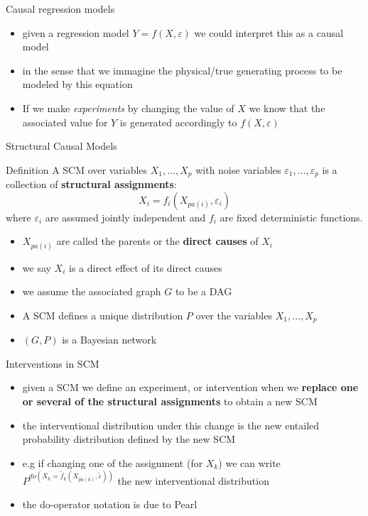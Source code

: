 \documentclass{beamer}
\begin{document}
\begin{frame}{Causal regression models}
      \begin{itemize}
	      \item given a regression model $Y = f(X, \varepsilon)$ 
		      we could interpret this as a causal model 
	      \item in the sense that we immagine the physical/true generating process 
		      to be modeled by this equation 
	      \item<2-> If we make \emph{experiments} by changing the value of $X$ we know that 
		      the associated value for $Y$ is generated accordingly to $f(X, \varepsilon)$ 
      \end{itemize}
\end{frame}

\begin{frame}{Structural Causal Models}
	\begin{block}{Definition \citep{peters2017elements}}
 A SCM over variables $X_1, \ldots, X_p$ with noise variables $\varepsilon_1, \ldots, \varepsilon_p$ is 
	 a collection of \textbf{structural assignments}: 
	   \[ X_i =  f_i(X_{pa(i)}, \varepsilon_i) \]
	   where $\varepsilon_i$ are assumed jointly independent and $f_i$ are fixed deterministic functions.  
	 \end{block}
	 \begin{itemize}
		 \item $X_{pa(i)}$ are called the parents or the \textbf{direct causes} of $X_i$
		 \item we say $X_i$ is a direct effect of its direct causes 
		 \item we assume the associated graph $G$ to be a DAG 
		 \item<2-> A SCM defines a unique distribution $P$ over the variables $X_1, \ldots, X_p$ 
		 \item<3-> $(G, P)$ is a Bayesian network 
	 \end{itemize}
\end{frame}


\begin{frame}{Interventions in SCM}
	\begin{itemize}
		\item given a SCM we define an experiment, or intervention when we \textbf{replace one or several of the structural assignments} to obtain a new SCM
		\item<2-> the interventional distribution under this change is the new entailed probability distribution defined by the new SCM
		\item<3-> e.g if changing one of the assignment (for $X_k$) we can write $P^{do(X_k = \tilde{f}_k(X_{\tilde{pa}(k)}, \tilde{\varepsilon}))}$ the new interventional distribution 
		\item<4-> the do-operator notation is due to Pearl 
	\end{itemize}
\end{frame}

\begin{frame}[allowframebreaks]

\end{frame}
\end{document}
